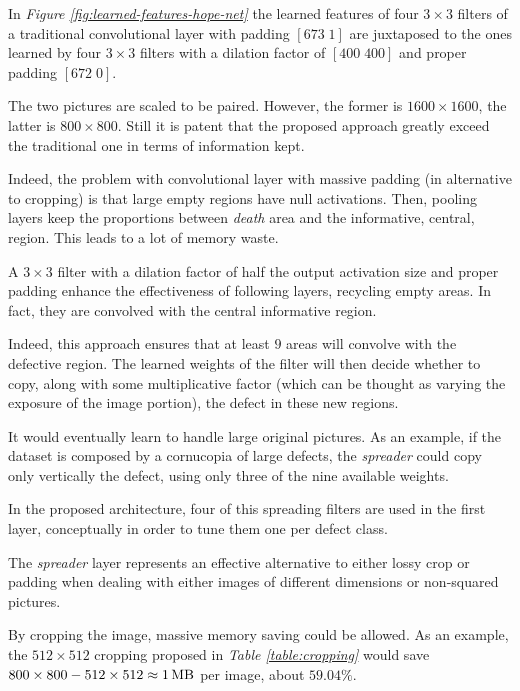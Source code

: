         \par{
            In \emph{Figure \ref{fig:learned-features-hope-net}} the learned features of four $3\times3$ filters of a traditional convolutional layer with padding $\left[673\;1\right]$ are juxtaposed to the ones learned by four $3\times 3$ filters with a dilation factor of $\left[400\;400\right]$ and proper padding $\left[672\;0\right]$. 
        }
        \par{
            The two pictures are scaled to be paired. However, the former is $1600 \times 1600$, the latter is $800\times 800$. Still it is patent that the proposed approach greatly exceed the traditional one in terms of information kept. 
        }
        \par{
            Indeed, the problem with convolutional layer with massive padding (in alternative to cropping) is that large empty regions have null activations. Then, pooling layers keep the proportions between \emph{death} area and the informative, central, region. This leads to a lot of memory waste.
        }
        \par{
            A $3\times 3$ filter with a dilation factor of half the output activation size and proper padding enhance the effectiveness of following layers, recycling empty areas. In fact, they are convolved with the central informative region.
        }
        \par{
            Indeed, this approach ensures that at least $9$ areas will convolve with the defective region. The learned weights of the filter will then decide whether to copy, along with some multiplicative factor (which can be thought as varying the exposure of the image portion), the defect in these new regions.
        }
        \par{
            It would eventually learn to handle large original pictures. As an example, if the dataset is composed by a cornucopia of large defects, the \emph{spreader} could copy only vertically the defect, using only three of the nine available weights.
        }
        \par{
            In the proposed architecture, four of this spreading filters are used in the first layer, conceptually in order to tune them one per defect class.
        }
        \par{
            The \emph{spreader} layer represents an effective alternative to either lossy crop or padding when dealing with either images of different dimensions or non-squared pictures.
        }
        \par{
            By cropping the image, massive memory saving could be allowed. As an example, the $512\times 512$ cropping proposed in \emph{Table \ref{table:cropping}} would save $800\times 800 - 512\times 512 \approx \SI{1}{\mega\byte}$ per image, about $59.04\%$.
        }
